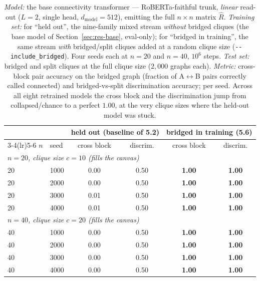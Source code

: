 \documentclass[11pt,a4paper]{article}
\begin{document}
\begin{table}[H]\centering\small
\begin{tabular}{llcccc}
\toprule
 & & \multicolumn{2}{c}{held out (baseline of 5.2)} & \multicolumn{2}{c}{bridged in training (5.6)} \\
\cmidrule(lr){3-4}\cmidrule(lr){5-6}
$n$ & seed & cross block & discrim. & cross block & discrim. \\
\midrule
\multicolumn{6}{l}{\emph{$n=20$, clique size $c=10$ (fills the canvas)}} \\
20 & 1000 & 0.00 & 0.50 & \textbf{1.00} & \textbf{1.00} \\
20 & 2000 & 0.00 & 0.50 & \textbf{1.00} & \textbf{1.00} \\
20 & 3000 & 0.01 & 0.50 & \textbf{1.00} & \textbf{1.00} \\
20 & 4000 & 0.01 & 0.50 & \textbf{1.00} & \textbf{1.00} \\
\multicolumn{6}{l}{\emph{$n=40$, clique size $c=20$ (fills the canvas)}} \\
40 & 1000 & 0.00 & 0.50 & \textbf{1.00} & \textbf{1.00} \\
40 & 2000 & 0.00 & 0.50 & \textbf{1.00} & \textbf{1.00} \\
40 & 3000 & 0.00 & 0.50 & \textbf{1.00} & \textbf{1.00} \\
40 & 4000 & 0.00 & 0.50 & \textbf{1.00} & \textbf{1.00} \\
\bottomrule
\end{tabular}
\caption{\emph{Model:} the base connectivity transformer --- RoBERTa-faithful trunk, \emph{linear}
read-out ($L=2$, single head, $d_{\mathrm{model}}=512$), emitting the full $n\times n$ matrix
$\hat R$. \emph{Training set:} for ``held out'', the nine-family mixed stream \emph{without} bridged
cliques (the base model of Section~\ref{sec:res-base}, eval-only); for ``bridged in training'', the
same stream \emph{with} bridged/split cliques added at a random clique size (\texttt{-{}-include\_bridged}).
Four seeds each at $n=20$ and $n=40$, $10^6$ steps. \emph{Test set:} bridged and split cliques at the
full clique size ($2{,}000$ graphs each). \emph{Metric:} cross-block pair accuracy on the bridged
graph (fraction of A$\leftrightarrow$B pairs correctly called connected) and bridged-vs-split
discrimination accuracy; per seed. Across all eight retrained models the cross block and the
discrimination jump from collapsed/chance to a perfect $1.00$, at the very clique sizes where the
held-out model was stuck.}
\label{tab:capacity}
\end{table}
\end{document}
